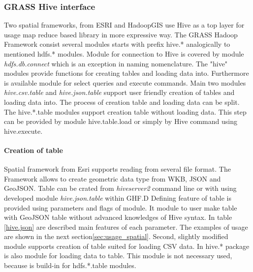 \documentclass[a4paper,12pt,oneside]{report}
\begin{document}
\subsubsection{GRASS Hive interface}
Two spatial frameworks, from ESRI and HadoopGIS use Hive as a top layer for usage map reduce based library in more expressive way. The GRASS Hadoop Framework consist several modules starts with prefix hive.* analogically to mentioned hdfs.* modules. Module for connection to Hive is covered by module \textit{hdfs.db.connect} which is an exception in naming nomenclature. The "hive" modules provide functions for creating tables and loading data into. Furthermore is available module for select queries and execute commands. Main two modules \textit{hive.csv.table} and \textit{hive.json.table} support user friendly creation of tables and loading data into. The process of creation table and loading data can be split. The hive.*.table modules support creation table without loading data. This step can be provided by module hive.table.load or simply by Hive command using hive.execute.


\paragraph{Creation of table} Spatial framework from Esri supports reading  from several file format.  The Framework allows to create geometric data type from  WKB, JSON and GeoJSON. Table can be crated from \textit{hiveserver2} command line or with using developed module  \textit{hive.json.table} within GHF.D Defining feature of table is provided using parameters and flags of module. It module to user make table with GeoJSON table without advanced knowledges of Hive syntax. In table \ref{hive.json} are described main features of each parameter. The examples of usage are shown in the next section\ref{sec:usage_spatial}. Second, slightly modified module supports creation of table suited for loading CSV data. In hive.* package is also module for loading data to table. This module is not necessary used, because is build-in for hdfs.*.table modules. 
\end{document}

